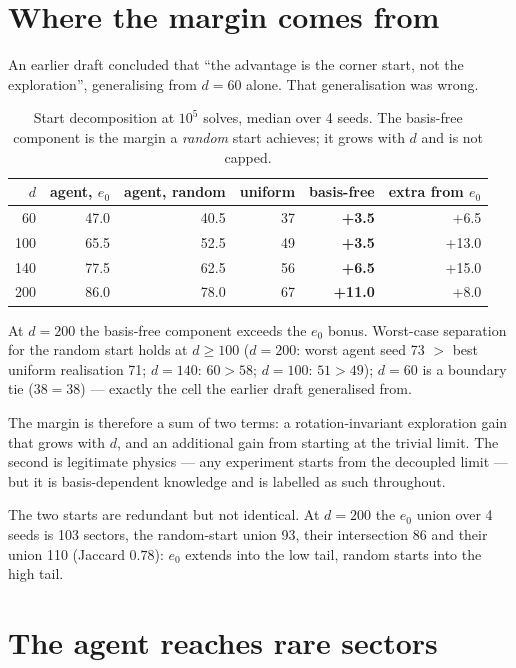 \documentclass[11pt,a4paper]{article}
\begin{document}
\section{Where the margin comes from}

An earlier draft concluded that ``the advantage is the corner start, not the exploration'',
generalising from $d=60$ alone. That generalisation was wrong.

\begin{table}[h]\centering\small
\caption{Start decomposition at $10^5$ solves, median over 4 seeds. The basis-free component
is the margin a \emph{random} start achieves; it grows with $d$ and is not capped.}
\begin{tabular}{r rrr rr}
\toprule
$d$ & agent, $e_0$ & agent, random & uniform & basis-free & extra from $e_0$\\
\midrule
60 & 47.0 & 40.5 & 37 & \textbf{+3.5} & +6.5\\
100 & 65.5 & 52.5 & 49 & \textbf{+3.5} & +13.0\\
140 & 77.5 & 62.5 & 56 & \textbf{+6.5} & +15.0\\
200 & 86.0 & 78.0 & 67 & \textbf{+11.0} & +8.0\\
\bottomrule
\end{tabular}
\end{table}

At $d=200$ the basis-free component exceeds the $e_0$ bonus. Worst-case separation for the
random start holds at $d\geq100$ ($d=200$: worst agent seed 73 $>$ best uniform realisation 71;
$d=140$: $60>58$; $d=100$: $51>49$); $d=60$ is a boundary tie ($38=38$) --- exactly the cell the
earlier draft generalised from.

The margin is therefore a sum of two terms: a rotation-invariant exploration gain that grows
with $d$, and an additional gain from starting at the trivial limit. The second is legitimate
physics --- any experiment starts from the decoupled limit --- but it is basis-dependent
knowledge and is labelled as such throughout.

The two starts are redundant but not identical. At $d=200$ the $e_0$ union over 4 seeds is 103
sectors, the random-start union 93, their intersection 86 and their union 110 (Jaccard $0.78$):
$e_0$ extends into the low tail, random starts into the high tail.

\section{The agent reaches rare sectors}
\end{document}
